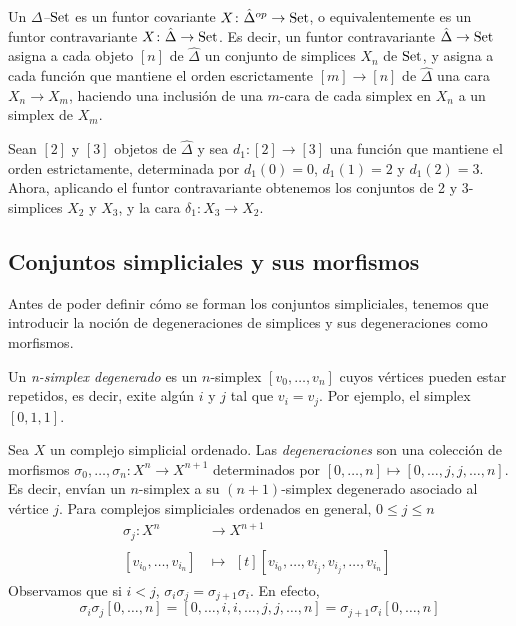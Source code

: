 \documentclass[../main.tex]{subfiles}
\begin{document}
\begin{defi}
    Un \emph{$\Delta$--$\mathop{\rm Set}$} es un funtor covariante $X\colon \hat{\Delta}^{op} \to \mathop{\rm Set}$, o equivalentemente es un funtor contravariante $X\colon \hat{\Delta} \to \mathop{\rm Set}$.
    Es decir, un funtor contravariante $\hat{\Delta} \to \mathop{\rm Set}$ asigna a cada objeto $[n]$ de $\hat{\Delta}$ un conjunto de simplices $X_n$ de $\mathop{\rm Set}$, y asigna a cada funci\'on que mantiene el orden escrictamente $[m]\to[n]$ de $\hat{\Delta}$ una cara $X_n \to X_m$, haciendo una inclusi\'on de una $m$-cara de cada simplex en $X_n$ a un simplex de $X_m$.
\end{defi}
\begin{ex}
    Sean $[2]$ y $[3]$ objetos de $\hat{\Delta}$ y sea $d_1\colon [2] \to [3]$ una funci\'on que mantiene el orden estrictamente, determinada por $d_1(0)=0$, $d_1(1)=2$ y $d_1(2)=3$. Ahora, aplicando el funtor contravariante obtenemos los conjuntos de 2 y 3-simplices $X_2$ y $X_3$, y la cara $\delta_1\colon X_3 \to X_2$.
\end{ex}


\subsection{Conjuntos simpliciales y sus morfismos}
Antes de poder definir c\'omo se forman los conjuntos simpliciales, tenemos que introducir la noci\'on de degeneraciones de simplices y sus degeneraciones como morfismos.

\begin{defi}
    Un \emph{n-simplex degenerado} es un $n$-simplex $[v_0,\dots,v_n]$ cuyos v\'ertices pueden estar repetidos, es decir, exite alg\'un $i$ y $j$ tal que $v_i=v_j$. Por ejemplo, el simplex $[0,1,1]$.
\end{defi}
\begin{defi}
    Sea $X$ un complejo simplicial ordenado. Las \emph{degeneraciones} son una colecci\'on de morfismos $\sigma_0,\dots,\sigma_n\colon X^n\to X^{n+1}$ determinados por $[0,\dots,n] \mapsto [0,\dots,j,j,\dots,n]$. Es decir, env\'ian un $n$-simplex a su $(n+1)$-simplex degenerado asociado al v\'ertice $j$.
    Para complejos simpliciales ordenados en general, $0\le j \le n$
    \begin{align*}
        \sigma_j: X^n           & \longrightarrow X^{n+1} \\
        [v_{i_0},\dots,v_{i_n}] & \longmapsto\!
        \begin{aligned}[t]
            [v_{i_0},\dots,v_{i_j},v_{i_j},\dots,v_{i_n}]
        \end{aligned}
    \end{align*}
    Observamos que si $i<j$, $\sigma_i\sigma_j = \sigma_{j+1}\sigma_{i}$. En efecto, $$\sigma_i\sigma_j[0,\dots,n] = [0,\dots,i,i,\dots,j,j,\dots,n] = \sigma_{j+1}\sigma_{i}[0,\dots,n]$$
\end{defi}
\end{document}
